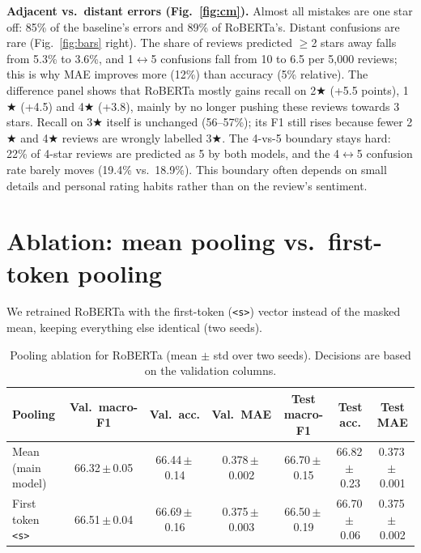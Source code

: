 \documentclass[11pt,a4paper]{article}
\newcommand{\st}{\ensuremath{{\scriptstyle\bigstar}}}
\newcommand{\pmstd}[2]{#1\,{\scriptsize$\pm$\,#2}}
\begin{document}
\textbf{Adjacent vs.\ distant errors (Fig.~\ref{fig:cm}).} Almost all mistakes are one star off: 85\% of the baseline's errors and 89\% of RoBERTa's. Distant confusions are rare (Fig.~\ref{fig:bars} right). The share of reviews predicted $\geq$2 stars away falls from 5.3\% to 3.6\%, and 1$\leftrightarrow$5 confusions fall from 10 to 6.5 per 5{,}000 reviews; this is why MAE improves more (12\%) than accuracy (5\% relative). The difference panel shows that RoBERTa mostly gains recall on 2\st{} (+5.5 points), 1\st{} (+4.5) and 4\st{} (+3.8), mainly by no longer pushing these reviews towards 3 stars. Recall on 3\st{} itself is unchanged (56--57\%); its F1 still rises because fewer 2\st{} and 4\st{} reviews are wrongly labelled 3\st{}. The 4-vs-5 boundary stays hard: 22\% of 4-star reviews are predicted as 5 by both models, and the 4$\leftrightarrow$5 confusion rate barely moves (19.4\% vs.\ 18.9\%). This boundary often depends on small details and personal rating habits rather than on the review's sentiment.

\section{Ablation: mean pooling vs.\ first-token pooling}\label{sec:ablation}
We retrained RoBERTa with the first-token (\texttt{<s>}) vector instead of the masked mean, keeping everything else identical (two seeds).

\begin{table}[htbp]
\centering\small
\caption{Pooling ablation for RoBERTa (mean $\pm$ std over two seeds). Decisions are based on the validation columns.}
\label{tab:ablation}
\begin{tabular}{lcccccc}
\toprule
\textbf{Pooling} & \textbf{Val.\ macro-F1} & \textbf{Val.\ acc.} & \textbf{Val.\ MAE} & \textbf{Test macro-F1} & \textbf{Test acc.} & \textbf{Test MAE} \\
\midrule
Mean (main model) & \pmstd{66.32}{0.05} & \pmstd{66.44}{0.14} & \pmstd{0.378}{0.002} & \pmstd{66.70}{0.15} & \pmstd{66.82}{0.23} & \pmstd{0.373}{0.001} \\
First token \texttt{<s>} & \pmstd{66.51}{0.04} & \pmstd{66.69}{0.16} & \pmstd{0.375}{0.003} & \pmstd{66.50}{0.19} & \pmstd{66.70}{0.06} & \pmstd{0.375}{0.002} \\
\bottomrule
\end{tabular}
\end{table}
\end{document}
